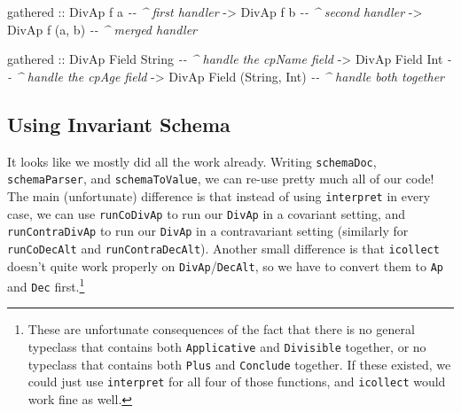 \documentclass[]{article}
\newenvironment{Shaded}{}{}
\newcommand{\CommentTok}[1]{\textcolor[rgb]{0.38,0.63,0.69}{\textit{#1}}}
\newcommand{\DataTypeTok}[1]{\textcolor[rgb]{0.56,0.13,0.00}{#1}}
\newcommand{\NormalTok}[1]{#1}
\newcommand{\OtherTok}[1]{\textcolor[rgb]{0.00,0.44,0.13}{#1}}
\begin{document}
\begin{Shaded}
\begin{Highlighting}[]
\NormalTok{gathered}
\OtherTok{    ::} \DataTypeTok{DivAp}\NormalTok{ f a          }\CommentTok{{-}{-} \^{} first handler}
    \OtherTok{{-}>} \DataTypeTok{DivAp}\NormalTok{ f b          }\CommentTok{{-}{-} \^{} second handler}
    \OtherTok{{-}>} \DataTypeTok{DivAp}\NormalTok{ f (a, b)     }\CommentTok{{-}{-} \^{} merged handler}

\NormalTok{gathered}
\OtherTok{    ::} \DataTypeTok{DivAp} \DataTypeTok{Field} \DataTypeTok{String}          \CommentTok{{-}{-} \^{} handle the cpName field}
    \OtherTok{{-}>} \DataTypeTok{DivAp} \DataTypeTok{Field} \DataTypeTok{Int}             \CommentTok{{-}{-} \^{} handle the cpAge field}
    \OtherTok{{-}>} \DataTypeTok{DivAp} \DataTypeTok{Field}\NormalTok{ (}\DataTypeTok{String}\NormalTok{, }\DataTypeTok{Int}\NormalTok{)   }\CommentTok{{-}{-} \^{} handle both together}
\end{Highlighting}
\end{Shaded}

\hypertarget{using-invariant-schema}{%
\subsection{Using Invariant Schema}\label{using-invariant-schema}}

It looks like we mostly did all the work already. Writing \texttt{schemaDoc},
\texttt{schemaParser}, and \texttt{schemaToValue}, we can re-use pretty much all
of our code! The main (unfortunate) difference is that instead of using
\texttt{interpret} in every case, we can use \texttt{runCoDivAp} to run our
\texttt{DivAp} in a covariant setting, and \texttt{runContraDivAp} to run our
\texttt{DivAp} in a contravariant setting (similarly for \texttt{runCoDecAlt}
and \texttt{runContraDecAlt}). Another small difference is that
\texttt{icollect} doesn't quite work properly on \texttt{DivAp}/\texttt{DecAlt},
so we have to convert them to \texttt{Ap} and \texttt{Dec} first.\footnote{These
  are unfortunate consequences of the fact that there is no general typeclass
  that contains both \texttt{Applicative} and \texttt{Divisible} together, or no
  typeclass that contains both \texttt{Plus} and \texttt{Conclude} together. If
  these existed, we could just use \texttt{interpret} for all four of those
  functions, and \texttt{icollect} would work fine as well.}
\end{document}
